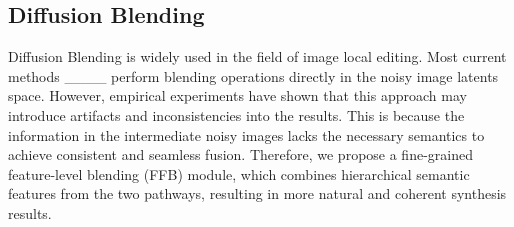 \subsection{Diffusion Blending}

Diffusion Blending is widely used in the field of image local editing. Most current methods ____ perform blending operations directly in the noisy image latents space. However, empirical experiments have shown that this approach may introduce artifacts and inconsistencies into the results. This is because the information in the intermediate noisy images lacks the necessary semantics to achieve consistent and seamless fusion. Therefore, we propose a fine-grained feature-level blending (FFB) module, which combines hierarchical semantic features from the two pathways, resulting in more natural and coherent synthesis results.